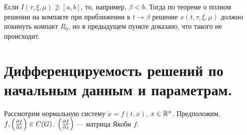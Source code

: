 \documentclass[a4paper]{report}
\begin{document}
{{{    Если $I(\tau,\xi,\mu) \not\supset [a, b]$, то, например, $\beta < b$. Тогда по теореме о полном решении на компакте при приближении к $t \to \beta$ решение $x(t, \tau, \xi, \mu)$ должно покинуть компакт $R_0$, но в предыдущем пункте доказано, что такого не происходит.\qedhere
    }
    }
    }
    \section{Дифференцируемость решений по начальным данным и параметрам.}
    Рассмотрим нормальную систему $\dot{x} = f(t, x)$, $x \in \mathbb{R}^n$.
    Предположим, $f, \left(\frac{\partial f}{\partial x}\right) \in C(G)$. $\left(\frac{\partial f}{\partial x}\right)$ --- матрица Якоби $f$.
\end{document}
